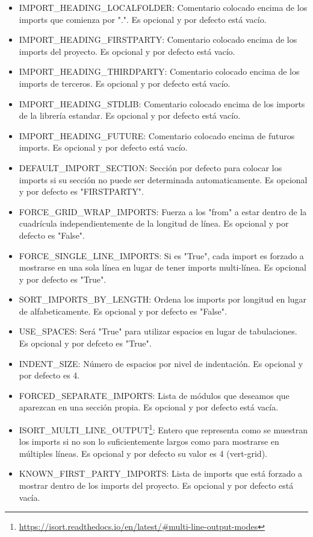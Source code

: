 \documentclass[a4paper, 12pt]{book}
\begin{document}
\begin{itemize}
\begin{itemize}
          \item IMPORT\_HEADING\_LOCALFOLDER: Comentario colocado encima de los imports que comienza por ".". Es opcional y por defecto está vacío.
          \item IMPORT\_HEADING\_FIRSTPARTY: Comentario colocado encima de los imports del proyecto. Es opcional y por defecto está vacío.
          \item IMPORT\_HEADING\_THIRDPARTY: Comentario colocado encima de los imports de terceros. Es opcional y por defecto está vacío.
          \item IMPORT\_HEADING\_STDLIB: Comentario colocado encima de los imports de la librería estandar. Es opcional y por defecto está vacío.
          \item IMPORT\_HEADING\_FUTURE: Comentario colocado encima de futuros imports. Es opcional y por defecto está vacío.
          \item DEFAULT\_IMPORT\_SECTION: Sección por defecto para colocar los imports si su sección no puede ser determinada automaticamente. Es opcional y por defecto es "FIRSTPARTY".
          \item FORCE\_GRID\_WRAP\_IMPORTS: Fuerza a los "from" a estar dentro de la cuadrícula independientemente de la longitud de línea. Es opcional y por defecto es "False".
          \item FORCE\_SINGLE\_LINE\_IMPORTS: Si es "True", cada import es forzado a mostrarse en una sola línea en lugar de tener imports multi-línea. Es opcional y por defecto es "True".
          \item SORT\_IMPORTS\_BY\_LENGTH: Ordena los imports por longitud en lugar de alfabeticamente. Es opcional y por defecto es "False".
          \item USE\_SPACES: Será "True" para utilizar espacios en lugar de tabulaciones. Es opcional y por defceto es "True".
          \item INDENT\_SIZE: Número de espacios por nivel de indentación. Es opcional y por defecto es 4.
          \item FORCED\_SEPARATE\_IMPORTS: Lista de módulos que deseamos que aparezcan en una sección propia. Es opcional y por defecto está vacía.
          \item ISORT\_MULTI\_LINE\_OUTPUT\footnote{\url{https://isort.readthedocs.io/en/latest/#multi-line-output-modes}}: Entero que representa como se muestran los imports si no son lo suficientemente largos como para mostrarse en múltiples líneas. Es opcional y por defecto su valor es 4 (vert-grid).
          \item KNOWN\_FIRST\_PARTY\_IMPORTS: Lista de imports que está forzado a mostrar dentro de los imports del proyecto. Es opcional y por defecto está vacía.

\end{itemize}
\end{itemize}
\end{document}
